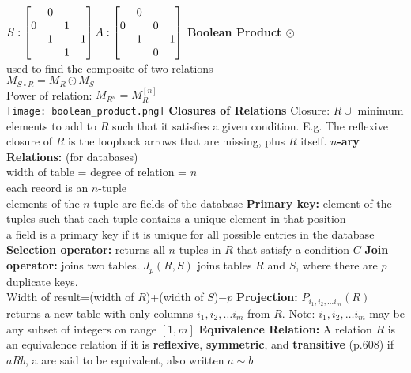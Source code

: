 \documentclass{article}
\newcommand{\upspace}{\vspace{0px}}
\newcommand{\bksp}{\hspace{-3px}}
\newcommand{\aaa}{\upspace \1\bksp}
\newcommand{\tbf}[1]{\textbf{#1}}
\begin{document}
\begin{multicols*}{2}
\begin{outline}[compactitem]
		$
	\\	S:\begin{bmatrix}
			 &0& & \\
			0& &1& \\
			 &1& &1\\
			 & &1& \\
		\end{bmatrix}	
		A:\begin{bmatrix}
			 &0& & \\
			0& &0& \\
			 &1& &1\\
			 & &0& \\
		\end{bmatrix}
		$
	\aaa \tbf{Boolean Product $\odot$}
	\\ used to find the composite of two relations
	\\ $M_{S\circ R} = M_R \odot M_S$
	\\ Power of relation: $M_{R^n} = M_R^{[n]}$
	\\ \texttt{[image: boolean\_product.png]}
\0 \tbf{Closures of Relations}
	\aaa Closure: $R \cup $ minimum elements to add to $R$ such that it satisfies a given condition.
	\aaa E.g. The reflexive closure of $R$ is the loopback arrows that are missing, plus $R$ itself.
\0 \tbf{$n$-ary Relations:}
	\aaa (for databases)
	\\ width of table = degree of relation = $n$
	\\ each record is an $n$-tuple
	\\ elements of the $n$-tuple are fields of the database
	\aaa \tbf{Primary key:} element of the tuples such that each tuple contains a unique element in that position
	\\ a field is a primary key if it is unique for all possible entries in the database
	\aaa \tbf{Selection operator:} returns all $n$-tuples in $R$ that satisfy a condition $C$
	\aaa \tbf{Join operator:} joins two tables. $J_p(R,S)$ joins tables $R$ and $S$, where there are $p$ duplicate keys.
	\\ Width of result=(width of $R$)+(width of $S$)$-p$
	\aaa \tbf{Projection:} $P_{i_1,i_2,\ldots i_m}(R)$ returns a new table with only columns $i_1,i_2,\ldots i_m$ from $R$. Note: $i_1,i_2,\ldots i_m$ may be any subset of integers on range $[1,m]$
\0 \tbf{Equivalence Relation:}
	\aaa A relation $R$ is an equivalence relation if it is \tbf{reflexive}, \tbf{symmetric}, and \tbf{transitive} \hfill (p.608)
	\aaa if $aRb$, a are said to be equivalent, also written $a\sim b$ 


\end{outline}
\end{multicols*}
\end{document}
